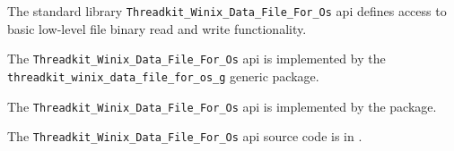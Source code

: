 
The standard library {\tt Threadkit\_Winix\_Data\_File\_For\_Os} api defines access to basic low-level 
file binary read and write functionality.

The {\tt Threadkit\_Winix\_Data\_File\_For\_Os} api is implemented by the {\tt threadkit\_winix\_data\_file\_for\_os\_g} generic package.

The {\tt Threadkit\_Winix\_Data\_File\_For\_Os} api is implemented by the  package.

The {\tt Threadkit\_Winix\_Data\_File\_For\_Os} api source code is in .
